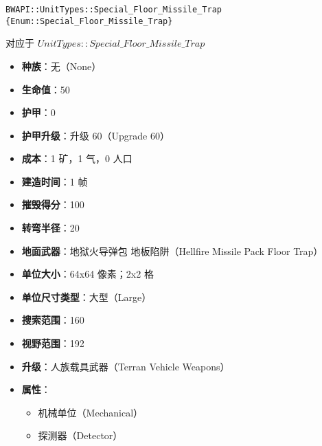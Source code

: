 \begin{tcolorbox}[colback=white, colframe=black!60!white, title=Special\_Floor\_Missile\_Trap(), arc=0mm]
    \begin{verbatim}
BWAPI::UnitTypes::Special_Floor_Missile_Trap {Enum::Special_Floor_Missile_Trap}
    \end{verbatim}
    对应于  $UnitTypes::Special\_Floor\_Missile\_Trap$ 
    \begin{itemize}
        \item \textbf{种族}：无（None）
        \item \textbf{生命值}：50
        \item \textbf{护甲}：0
        \item \textbf{护甲升级}：升级 60（Upgrade 60）
        \item \textbf{成本}：1 矿，1 气，0 人口
        \item \textbf{建造时间}：1 帧
        \item \textbf{摧毁得分}：100
        \item \textbf{转弯半径}：20
        \item \textbf{地面武器}：地狱火导弹包 地板陷阱（Hellfire Missile Pack Floor Trap）
        \item \textbf{单位大小}：64x64 像素；2x2 格
        \item \textbf{单位尺寸类型}：大型（Large）
        \item \textbf{搜索范围}：160
        \item \textbf{视野范围}：192
        \item \textbf{升级}：人族载具武器（Terran Vehicle Weapons）
        \item \textbf{属性}：
            \begin{itemize}
                \item 机械单位（Mechanical）
                \item 探测器（Detector）
            \end{itemize}
    \end{itemize}
\end{tcolorbox}


